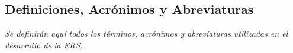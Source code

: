 \subsection{Definiciones, Acrónimos y Abreviaturas}
\par \emph{Se   definirán   aquí   todos   los   términos,   acrónimos   y   abreviaturas   utilizadas   en   el desarrollo de la ERS.}

